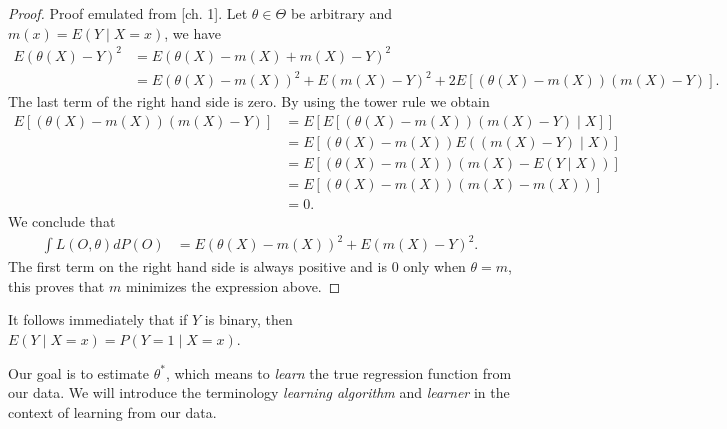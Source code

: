 \documentclass[11pt, a4paper]{article}
\theoremstyle{definition}
\theoremstyle{remark}
\newcommand{\btheta}{\theta}
\begin{document}
\begin{proof}
    Proof emulated from \parencite{gyorfi2002distribution}[ch. 1]. 
    Let $ \btheta \in \Theta $ be arbitrary and $ m(x) = E(Y \mid X = x) $, we have 
    \begin{align*}
        E(\theta(X) - Y)^2 &= E( \theta(X) - m(X) + m(X) - Y )^2 \\
                             &= E( \theta(X) - m(X) )^2 + E( m(X) - Y )^2 + 2 E[ (\theta(X) - m(X))(m(X) - Y) ].
    \end{align*}
    The last term of the right hand side is zero. By using the tower rule we obtain
    \begin{align*}
        E[ (\theta(X) - m(X))(m(X) - Y) ] &= E[ E[ (\theta(X) - m(X))(m(X) - Y) \mid X] ] \\
                                                       &= E[ (\theta(X) - m(X)) E( (m(X) - Y) \mid X) ] \\
                                                       &= E[ (\theta(X) - m(X)) ( m(X) - E(Y \mid X)) ] \\
                                                       &= E[ (\theta(X) - m(X)) ( m(X) - m(X)) ] \\
                                                       &= 0.
    \end{align*}
    We conclude that
    \begin{align*}
        \int L(O, \theta) d P(O) &= E( \theta(X) - m(X) )^2 + E ( m(X) - Y )^2.
    \end{align*}
    The first term on the right hand side is always positive and is $ 0 $ only when $ \theta = m $, this proves that $ m $ minimizes the expression above. 
\end{proof}
\noindent It follows immediately that if $ Y $ is binary, then $ E(Y \mid X = x) = P(Y = 1 \mid X = x) $. 

Our goal is to estimate $ \btheta^{*} $, which means to \textit{learn} the true regression function from our data. We will introduce the terminology \textit{learning algorithm} and \textit{learner} in the context of learning from our data.  
\end{document}
